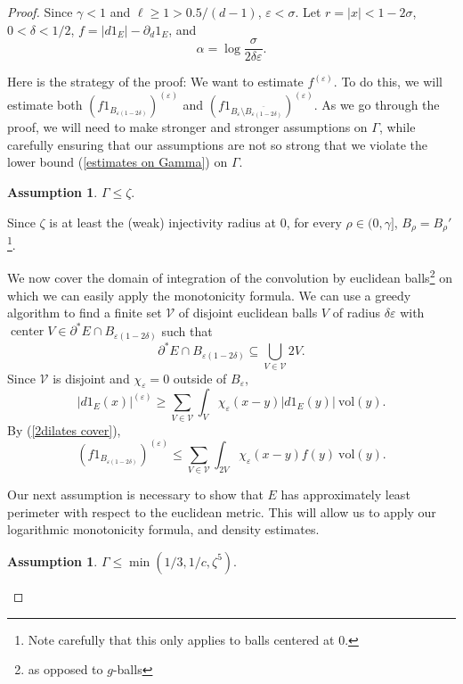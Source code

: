 \documentclass[reqno,12pt,letterpaper]{amsart}
\DeclareMathOperator{\cent}{center}
\newcommand{\vol}{\mathrm{vol}}
\theoremstyle{definition}
\newtheorem{assumption}[theorem]{Assumption}
\numberwithin{equation}{section}
\begin{document}
\begin{proof}
Since $\gamma < 1$ and $\ell \geq 1 > 0.5/(d-1)$, $\varepsilon < \sigma$.
Let $r = |x| < 1 - 2\sigma$, $0 < \delta < 1/2$, $f = |d1_E| - \partial_d 1_E$, and
$$\alpha = \log \frac{\sigma}{2\delta\varepsilon}.$$

Here is the strategy of the proof:
We want to estimate $f^{(\varepsilon)}$.
To do this, we will estimate both $(f1_{B_{\varepsilon(1 - 2\delta)}})^{(\varepsilon)}$ and $(f1_{B_\varepsilon \setminus \overline{B_{\varepsilon(1 - 2\delta)}}})^{(\varepsilon)}$.
As we go through the proof, we will need to make stronger and stronger assumptions on $\Gamma$, while carefully ensuring that our assumptions are not so strong that we violate the lower bound (\ref{estimates on Gamma}) on $\Gamma$.

\begin{assumption}\label{BMA1}
$\Gamma \leq \zeta$.
\end{assumption}

Since $\zeta$ is at least the (weak) injectivity radius at $0$, for every $\rho \in (0, \gamma]$, $B_\rho = B_\rho'$\footnote{Note carefully that this only applies to balls centered at $0$.}.

We now cover the domain of integration of the convolution by euclidean balls\footnote{as opposed to $g$-balls} on which we can easily apply the monotonicity formula.
We can use a greedy algorithm to find a finite set $\mathcal V$ of disjoint euclidean balls $V$ of radius $\delta\varepsilon$ with $\cent V \in \partial^* E \cap B_{\varepsilon(1 - 2\delta)}$ such that
\begin{equation}\label{2dilates cover}
\partial^* E \cap B_{\varepsilon(1 - 2\delta)} \subseteq \bigcup_{V \in \mathcal V} 2V.
\end{equation}
Since $\mathcal V$ is disjoint and $\chi_\varepsilon = 0$ outside of $B_\varepsilon$,
$$|d1_E(x)|^{(\varepsilon)} \geq \sum_{V \in \mathcal V} \int_V \chi_\varepsilon(x - y) |d1_E(y)| ~\vol(y).$$
By (\ref{2dilates cover}),
$$(f1_{B_{\varepsilon(1 - 2\delta)}})^{(\varepsilon)} \leq \sum_{V \in \mathcal V} \int_{2V} \chi_\varepsilon(x - y)f(y) ~\vol(y).$$

Our next assumption is necessary to show that $E$ has approximately least perimeter with respect to the euclidean metric.
This will allow us to apply our logarithmic monotonicity formula, and density estimates.

\begin{assumption}\label{BMA2}
$\Gamma \leq \min(1/3, 1/c, \zeta^5)$.
\end{assumption}


\end{proof}
\end{document}
